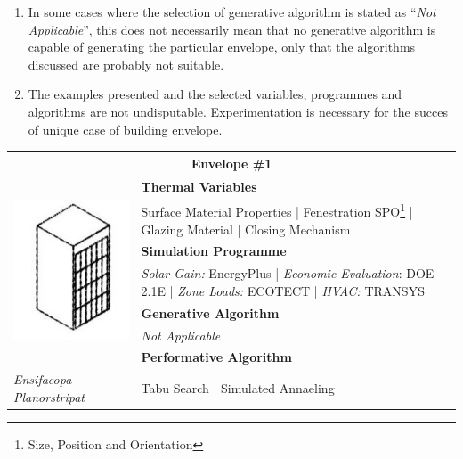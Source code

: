 \begin{enumerate}
	\item In some cases where the selection of generative algorithm is stated as ``\emph{Not Applicable}'', this does not necessarily mean that no generative algorithm is capable of generating the particular envelope, only that the algorithms discussed are probably not suitable.
	\item The examples presented and the selected variables, programmes and algorithms are not undisputable. Experimentation is necessary for the succes of unique case of building envelope.
\end{enumerate}

\clearpage

\begin{table}
	\begin{tabular}{ | m{6cm} | m{14cm} |}
	\toprule
	\multicolumn{2}{c}{Envelope \#{}1} \\[1cm] \hline
	\multirow{7}{*}{\includegraphics[width=5cm]{./Images/10-Envelope1}} & \textbf{Thermal Variables} \\[1cm]
	& Surface Material Properties | Fenestration SPO\footnote{Size, Position and Orientation} | Glazing Material | Closing Mechanism\vspace{0.5cm}\\ \cline{2-2}
		 & \textbf{Simulation Programme} \\[1cm]
		 & \emph{Solar Gain:} EnergyPlus | \emph{Economic Evaluation}: DOE-2.1E | \emph{Zone Loads:} ECOTECT | \emph{HVAC:} TRANSYS \vspace{0.5cm}\\ \cline{2-2}
		 & \textbf{Generative Algorithm} \\[1cm]
		 & \emph{Not Applicable}\vspace{0.5cm}\\ \cline{2-2}
		 & \textbf{Performative Algorithm} \\[1cm]
		 \emph{Ensifacopa Planorstripat} &  Tabu Search | Simulated Annaeling\vspace{0.5cm}\\
	\bottomrule
	\end{tabular}
\end{table}

